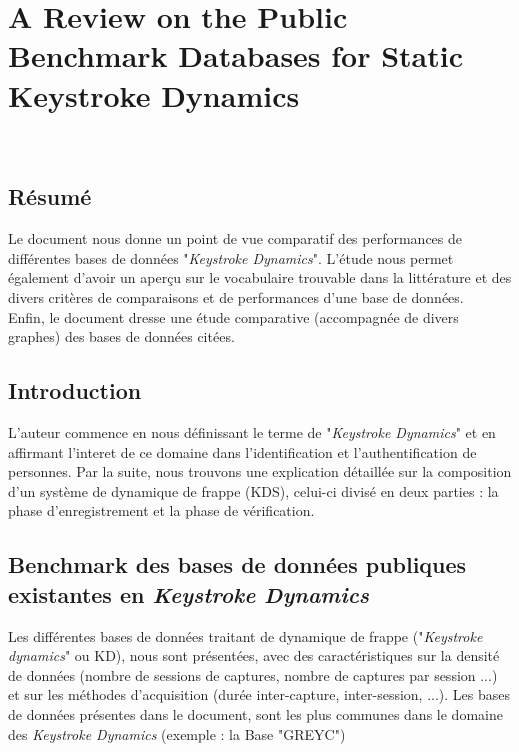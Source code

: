 \section{A Review on the Public Benchmark Databases for Static Keystroke Dynamics\cite{giotBenchmark}}

\\

\subsection{Résumé}

Le document nous donne un point de vue comparatif des performances de différentes bases de données "\textit{Keystroke Dynamics}".    
L'étude nous permet également d'avoir un aperçu sur le vocabulaire trouvable dans la littérature et des divers critères de comparaisons et de performances d'une base de données.\\

Enfin, le document dresse une étude comparative (accompagnée de divers graphes) des bases de données citées.

\subsection{Introduction}

L'auteur commence en nous définissant le terme de "\textit{Keystroke Dynamics}" et en affirmant l'interet de ce domaine dans l'identification et l'authentification de personnes. Par la suite, nous trouvons une explication détaillée sur la composition d'un système de dynamique de frappe (KDS), celui-ci divisé en deux parties : la phase d'enregistrement et la phase de vérification.

\subsection{Benchmark des bases de données publiques existantes en \textit{Keystroke Dynamics}}

Les différentes bases de données traitant de dynamique de frappe ("\textit{Keystroke dynamics}" ou  KD), nous sont présentées, avec des caractéristiques sur la densité de données (nombre de sessions de captures, nombre de captures par session ...) et sur les méthodes d'acquisition (durée inter-capture, inter-session, ...).  Les bases de données présentes dans le document, sont les plus communes dans le domaine des \textit{Keystroke Dynamics} (exemple : la Base "GREYC")

